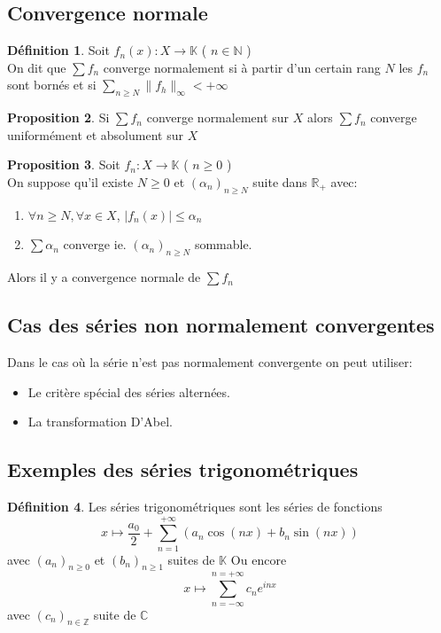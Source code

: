 \documentclass[10pt,a4paper]{article}
\theoremstyle{definition}
\newtheorem{proposition}{Proposition}[section]
\newtheorem{definition}[proposition]{Définition}
\begin{document}
\subsection{Convergence normale}
\begin{definition}
    Soit $f_n(x): X \to \mathbb{K}$ ( $n \in \mathbb{N}$ ) \\
    On dit que $\sum f_n$ converge normalement si à partir d'un certain rang $N$ les $f_n$ sont bornés et si $\sum\limits_{n \geq N} \lVert f_h \rVert_\infty < +\infty$
\end{definition}
\begin{proposition}
    Si $\sum f_n$ converge normalement sur $X$ alors $\sum f_n$ converge uniformément et absolument sur $X$
\end{proposition}
\begin{proposition}
    Soit $f_n: X \to \mathbb{K}$ ( $n \geq 0$ ) \\
    On suppose qu'il existe $N \geq 0$ et $(\alpha_n)_{n \geq N}$ suite dans $\mathbb{R}_+$ avec:
    \begin{enumerate}
        \item $\forall n \geq N, \forall x \in X$, $|f_n(x)| \leq \alpha_n $
        \item $\sum \alpha_n$ converge ie. $(\alpha_n)_{n \geq N}$ sommable.
    \end{enumerate}
    Alors il y a convergence normale de $\sum f_n$
\end{proposition}

\subsection{Cas des séries non normalement convergentes}
\noindent Dans le cas où la série n'est pas normalement convergente on peut utiliser:
\begin{itemize}
    \item Le critère spécial des séries alternées.
    \item La transformation D'Abel.
\end{itemize}

\subsection{Exemples des séries trigonométriques}
\begin{definition}
    Les séries trigonométriques sont les séries de fonctions
    \[x \mapsto \frac{a_0}{2} + \sum_{n = 1}^{+\infty}\left(a_n \cos(nx) + b_n \sin(nx)\right)\]
    avec $(a_n)_{n \geq 0}$ et $(b_n)_{n \geq 1}$ suites de $\mathbb{K}$
    Ou encore
    \[x \mapsto \sum_{n = -\infty}^{n = +\infty}c_n e^{inx}\]
    avec $(c_n)_{n \in \mathbb{Z}}$ suite de $\mathbb{C}$
\end{definition}
\end{document}
